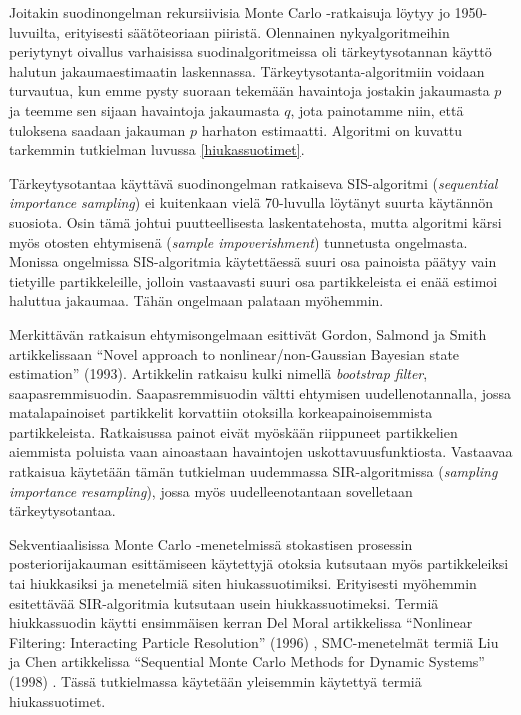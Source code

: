 \documentclass[
  12pt,
  a4paper, twoside]{book}
\begin{document}
Joitakin suodinongelman rekursiivisia Monte Carlo -ratkaisuja löytyy jo 1950-luvuilta, erityisesti säätöteoriaan piiristä. Olennainen nykyalgoritmeihin periytynyt oivallus varhaisissa suodinalgoritmeissa oli tärkeytysotannan käyttö halutun jakaumaestimaatin laskennassa. Tärkeytysotanta-algoritmiin voidaan turvautua, kun emme pysty suoraan tekemään havaintoja jostakin jakaumasta \(p\) ja teemme sen sijaan havaintoja jakaumasta \(q\), jota painotamme niin, että tuloksena saadaan jakauman \(p\) harhaton estimaatti. Algoritmi on kuvattu tarkemmin tutkielman luvussa \ref{hiukassuotimet}.

Tärkeytysotantaa käyttävä suodinongelman ratkaiseva SIS-algoritmi (\emph{sequential importance sampling}) ei kuitenkaan vielä 70-luvulla löytänyt suurta käytännön suosiota. Osin tämä johtui puutteellisesta laskentatehosta, mutta algoritmi kärsi myös otosten ehtymisenä (\emph{sample impoverishment}) tunnetusta ongelmasta. Monissa ongelmissa SIS-algoritmia käytettäessä suuri osa painoista päätyy vain tietyille partikkeleille, jolloin vastaavasti suuri osa partikkeleista ei enää estimoi haluttua jakaumaa. Tähän ongelmaan palataan myöhemmin.

Merkittävän ratkaisun ehtymisongelmaan esittivät Gordon, Salmond ja Smith artikkelissaan ``Novel approach to nonlinear/non-Gaussian Bayesian state estimation'' (1993). \citep{Gordon-1993} Artikkelin ratkaisu kulki nimellä \emph{bootstrap filter}, saapasremmisuodin. Saapasremmisuodin vältti ehtymisen uudellenotannalla, jossa matalapainoiset partikkelit korvattiin otoksilla korkeapainoisemmista partikkeleista. Ratkaisussa painot eivät myöskään riippuneet partikkelien aiemmista poluista vaan ainoastaan havaintojen uskottavuusfunktiosta. Vastaavaa ratkaisua käytetään tämän tutkielman uudemmassa SIR-algoritmissa (\emph{sampling importance resampling}), jossa myös uudelleenotantaan sovelletaan tärkeytysotantaa.

Sekventiaalisissa Monte Carlo -menetelmissä stokastisen prosessin posteriorijakauman esittämiseen käytettyjä otoksia kutsutaan myös partikkeleiksi tai hiukkasiksi ja menetelmiä siten hiukassuotimiksi. Erityisesti myöhemmin esitettävää SIR-algoritmia kutsutaan usein hiukkassuotimeksi. Termiä hiukkassuodin käytti ensimmäisen kerran Del Moral artikkelissa ``Nonlinear Filtering: Interacting Particle Resolution'' (1996) \citep{DelMoral-1996}, SMC-menetelmät termiä Liu ja Chen artikkelissa ``Sequential Monte Carlo Methods for Dynamic Systems'' (1998) \citep{Liu-1998}. Tässä tutkielmassa käytetään yleisemmin käytettyä termiä hiukassuotimet.
\end{document}
